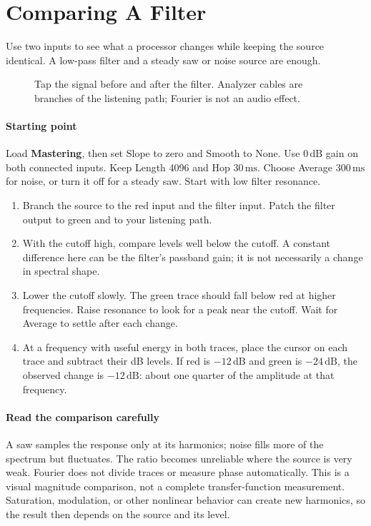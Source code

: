 \clearpage
\section{Comparing A Filter}\label{sec:filter}

Use two inputs to see what a processor changes while keeping the source
identical. A low-pass filter and a steady saw or noise source are enough.

\begin{figure}[!htp]
\centering

\caption{Tap the signal before and after the filter. Analyzer cables are
branches of the listening path; Fourier is not an audio effect.}
\end{figure}

\paragraph{Starting point}
Load \textbf{Mastering}, then set Slope to zero and Smooth to None. Use
$0\,\mathrm{dB}$ gain on both connected inputs. Keep Length 4096 and
Hop $30\,\mathrm{ms}$. Choose Average $300\,\mathrm{ms}$ for noise, or
turn it off for a steady saw. Start with low filter resonance.

\begin{enumerate}
  \item Branch the source to the red input and the filter input. Patch
  the filter output to green and to your listening path.
  \item With the cutoff high, compare levels well below the cutoff. A
  constant difference here can be the filter's passband gain; it is not
  necessarily a change in spectral shape.
  \item Lower the cutoff slowly. The green trace should fall below red at
  higher frequencies. Raise resonance to look for a peak near the cutoff.
  Wait for Average to settle after each change.
  \item At a frequency with useful energy in both traces, place the cursor
  on each trace and subtract their dB levels. If red is $-12\,\mathrm{dB}$
  and green is $-24\,\mathrm{dB}$, the observed change is $-12\,\mathrm{dB}$:
  about one quarter of the amplitude at that frequency.
\end{enumerate}

\paragraph{Read the comparison carefully}
A saw samples the response only at its harmonics; noise fills more of the
spectrum but fluctuates. The ratio becomes unreliable where the source is
very weak. Fourier does not divide traces or measure phase automatically.
This is a visual magnitude comparison, not a complete transfer-function
measurement. Saturation, modulation, or other nonlinear behavior can create
new harmonics, so the result then depends on the source and its level.

